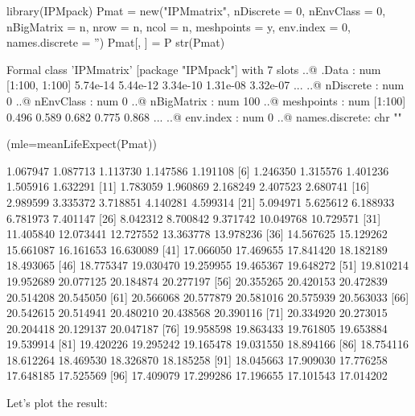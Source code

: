 \documentclass[11pt]{article}
\begin{document}
\begin{Schunk}
\begin{Sinput}
 library(IPMpack)
 Pmat = new("IPMmatrix", nDiscrete = 0, nEnvClass = 0, 
          nBigMatrix = n, nrow = n, ncol = n, meshpoints = y, 
          env.index = 0, names.discrete = '')
 Pmat[, ] = P 
 str(Pmat)
\end{Sinput}
\begin{Soutput}
Formal class 'IPMmatrix' [package "IPMpack"] with 7 slots
  ..@ .Data         : num [1:100, 1:100] 5.74e-14 5.44e-12 3.34e-10 1.31e-08 3.32e-07 ...
  ..@ nDiscrete     : num 0
  ..@ nEnvClass     : num 0
  ..@ nBigMatrix    : num 100
  ..@ meshpoints    : num [1:100] 0.496 0.589 0.682 0.775 0.868 ...
  ..@ env.index     : num 0
  ..@ names.discrete: chr ""
\end{Soutput}
\begin{Sinput}
 (mle=meanLifeExpect(Pmat))
\end{Sinput}
\begin{Soutput}
  [1]  1.067947  1.087713  1.113730  1.147586  1.191108
  [6]  1.246350  1.315576  1.401236  1.505916  1.632291
 [11]  1.783059  1.960869  2.168249  2.407523  2.680741
 [16]  2.989599  3.335372  3.718851  4.140281  4.599314
 [21]  5.094971  5.625612  6.188933  6.781973  7.401147
 [26]  8.042312  8.700842  9.371742 10.049768 10.729571
 [31] 11.405840 12.073441 12.727552 13.363778 13.978236
 [36] 14.567625 15.129262 15.661087 16.161653 16.630089
 [41] 17.066050 17.469655 17.841420 18.182189 18.493065
 [46] 18.775347 19.030470 19.259955 19.465367 19.648272
 [51] 19.810214 19.952689 20.077125 20.184874 20.277197
 [56] 20.355265 20.420153 20.472839 20.514208 20.545050
 [61] 20.566068 20.577879 20.581016 20.575939 20.563033
 [66] 20.542615 20.514941 20.480210 20.438568 20.390116
 [71] 20.334920 20.273015 20.204418 20.129137 20.047187
 [76] 19.958598 19.863433 19.761805 19.653884 19.539914
 [81] 19.420226 19.295242 19.165478 19.031550 18.894166
 [86] 18.754116 18.612264 18.469530 18.326870 18.185258
 [91] 18.045663 17.909030 17.776258 17.648185 17.525569
 [96] 17.409079 17.299286 17.196655 17.101543 17.014202
\end{Soutput}
\end{Schunk}

Let's plot the result:
\end{document}
